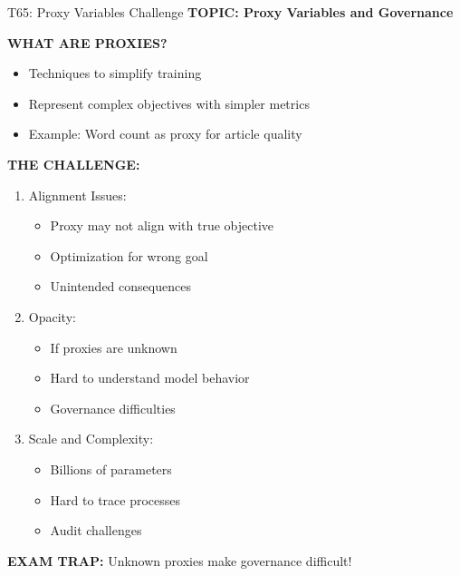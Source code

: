 \documentclass[8pt]{beamer}
\begin{document}
	\begin{frame}{T65: Proxy Variables Challenge}
		\fontsize{6.5}{7.5}\selectfont
		\textbf{TOPIC: Proxy Variables and Governance}
		
		\vspace{0.1cm}
		\textbf{WHAT ARE PROXIES?}
		\begin{itemize}
			\item Techniques to simplify training
			\item Represent complex objectives with simpler metrics
			\item Example: Word count as proxy for article quality
		\end{itemize}
		
		\vspace{0.1cm}
		\textbf{THE CHALLENGE:}
		\begin{enumerate}
			\item \textcolor{myblue}{Alignment Issues:}
			\begin{itemize}
				\item Proxy may not align with true objective
				\item Optimization for wrong goal
				\item Unintended consequences
			\end{itemize}
			\item \textcolor{myblue}{Opacity:}
			\begin{itemize}
				\item If proxies are unknown
				\item Hard to understand model behavior
				\item Governance difficulties
			\end{itemize}
			\item \textcolor{myblue}{Scale and Complexity:}
			\begin{itemize}
				\item Billions of parameters
				\item Hard to trace processes
				\item Audit challenges
			\end{itemize}
		\end{enumerate}
		
		\textcolor{myred}{\textbf{EXAM TRAP:}} Unknown proxies \textcolor{myblue}{make governance difficult}!
	\end{frame}
	
\end{document}
